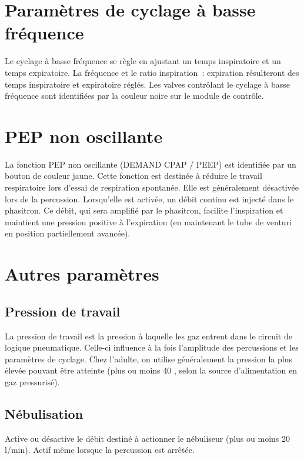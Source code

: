 \section{Paramètres de cyclage à basse fréquence}

Le cyclage à basse fréquence se règle en ajustant un temps inspiratoire et un
temps expiratoire.  La fréquence et le ratio inspiration : expiration
résulteront des temps inspiratoire et expiratoire réglés. Les valves contrôlant
le cyclage à basse fréquence sont identifiées par la couleur noire sur le
module de contrôle.

\section{PEP non oscillante}

La fonction PEP non oscillante (DEMAND CPAP / PEEP) est identifiée par un
bouton de couleur jaune.  Cette fonction est destinée à réduire le travail
respiratoire lors d’essai de respiration spontanée. Elle est généralement
désactivée lors de la percussion. Lorsqu’elle est activée, un débit continu est
injecté dans le phasitron. Ce débit, qui sera amplifié par le phasitron,
facilite l’inspiration et maintient une pression positive à l’expiration (en
maintenant le tube de venturi en position partiellement avancée).  

\section{Autres paramètres}

\subsection{Pression de travail}

La pression de travail est la pression à laquelle les gaz entrent dans le
circuit de logique pneumatique. Celle-ci influence à la fois l’amplitude des
percussions et les paramètres de cyclage. Chez l’adulte, on utilise
généralement la pression la plus élevée pouvant être atteinte (plus ou moins 40
\psi, selon la source d’alimentation en gaz pressurisé).


\subsection{Nébulisation}

Active ou désactive le débit destiné à actionner le nébuliseur (plus ou moins
20 l/min). Actif même lorsque la percussion est arrêtée. 

